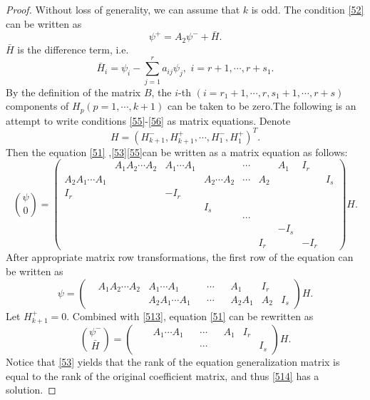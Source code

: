 \documentclass[a4paper,reqno,11pt]{amsart}
\numberwithin{equation}{section} %
\begin{document}
\begin{proof}
	Without loss of generality, we can assume that $k$ is odd. The condition \ref{52} can be written as
\begin{equation}\label{513}
	\psi^{+}=A_2\psi ^{-}+\bar{H} .
\end{equation}
$\bar{H}$  is the difference term, i.e.
\begin{equation}
    \bar{H}_i =\psi _i- \sum_{j=1}^r{a_{ij}\psi _j,\,\,i=r+1,\cdots ,r+s_1}.
\end{equation}
By the definition of the matrix $B$, the $i$-th $(i=r_1+1,\cdots,r,s_1+1,\cdots,r+s)$ components of $H_p(p = 1, \cdots , k+1)$ can be taken to be zero.The following is an attempt to write conditions \eqref{55}-\eqref{56} as matrix equations. Denote
$$
H=\left( H^{-}_{k+1},H^{+}_{k+1},\cdots ,H^{-}_{1},H^{+}_{1} \right) ^T .
$$
Then the equation \eqref{51} ,\eqref{53}\eqref{55}can be written as a matrix equation as follows:
$$
\binom{\psi}{0} = \left( \begin{matrix}
   & A_1A_2\cdots A_2&		A_1\cdots A_1&	&	\cdots&		&A_1 & I _r&		\\
    A_2A_1\cdots A_1&	&	&A_2\cdots A_2&		\cdots&		A_2&	&	&I_s\\
    I_r& &-I_r &  & & & & & \\
    & & & I_s & & & & &\\
    & & &  & \cdots& & & &\\
    & & &  & & & -I_s& &\\
    & & &  & &I_r & & -I_r& 
\end{matrix} \right) H.
$$
After appropriate matrix row transformations, the first row of the equation can be written as
$$
\psi = \left( \begin{matrix}
  &  A_1A_2\cdots A_2&		A_1\cdots A_1&	&	\cdots&	&	A_1&	I_r&	\\
   & &  A_2A_1\cdots A_1&	&	\cdots&		&	A_2A_1 &	A_2 &	I_s
\end{matrix} \right) H.
$$
Let $H^{+}_{k+1}=0$. Combined with \eqref{513}, equation \eqref{51} can be rewritten as
\begin{equation}\label{514}
	\binom{\psi ^{-}}{\bar{H} } =\left( \begin{matrix}
		&  &		A_1\cdots A_1&	&	\cdots&	&	A_1&	I_r&	\\
		 & &  &	&	\cdots&	&	 & &	I_s
	  \end{matrix} \right) H.
\end{equation}
Notice that \eqref{53}  yields that the rank of the equation generalization matrix is equal to the rank of the original coefficient matrix, and thus \eqref{514} has a solution.
\end{proof}
\end{document}
